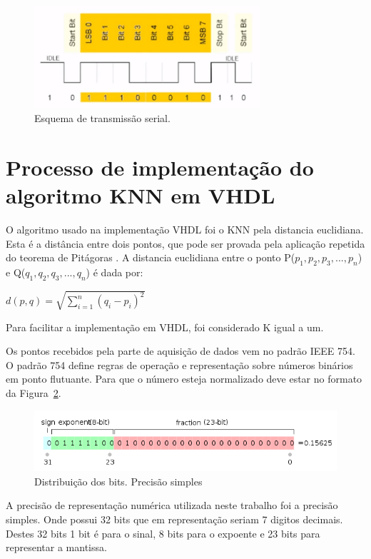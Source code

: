 \documentclass[12pt]{article}
\begin{document}
\begin{figure}[!hb]
\centering
\includegraphics[width=3.3in]{img/uart.png}
\caption{Esquema de transmissão serial.}
\label{simulacao}
\end{figure}

\section{Processo de implementação do algoritmo KNN em VHDL}

O algoritmo usado na implementação VHDL foi o KNN pela distancia euclidiana. 
Esta é a distância entre dois pontos, que pode ser provada pela aplicação
repetida do teorema de Pitágoras \cite{wiki:ieee754en}. A distancia euclidiana
entre o ponto P($p_1, p_2, p_3, ..., p_n$) e Q($q_1, q_2, q_3, ..., q_n$) é
dada por:

$d(p, q) = \sqrt{\sum\limits_{i=1}^n (q_i - p_i)^2}$

Para facilitar a implementação em VHDL, foi considerado K igual a um. 

Os pontos recebidos pela parte de aquisição de dados vem no padrão IEEE 754. O
padrão 754 define regras de operação e representação sobre números binários em
ponto flutuante. Para que o número esteja normalizado deve estar no formato da
Figura~\ref{fig:ieee754ps}.

\begin{figure}[ht]
\centering
\includegraphics[width=.5\textwidth]{img/IEEE_754_Single_Floating_Point_Format}
\caption{Distribuição dos bits. Precisão simples \cite{wiki:ieee754en}}
\label{fig:ieee754ps}
\end{figure}

A precisão de representação numérica utilizada neste trabalho foi a precisão 
simples. Onde possui 32 bits que em representação seriam 7 digitos decimais.
Destes 32 bits 1 bit é para o sinal, 8 bits para o expoente e 23 bits para 
representar a mantissa.
\end{document}
